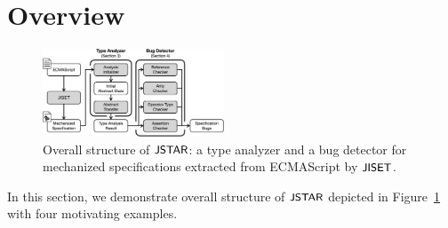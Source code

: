 \section{Overview}\label{sec:overview}

\begin{figure}
  \centering
  \includegraphics[width=0.48\textwidth]{img/overall}
  \vspace*{-1.5em}
  \caption{Overall structure of $\textsf{\small JSTAR}$: a type analyzer and a bug detector for
  mechanized specifications extracted from ECMAScript by $\textsf{\small JISET}$.}
  \label{fig:overall}
\end{figure}

In this section, we demonstrate overall structure of $\textsf{\small JSTAR}$ depicted in
Figure~\ref{fig:overall} with four motivating examples.
